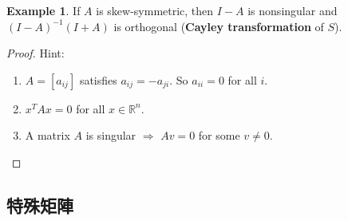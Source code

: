 \documentclass{article}
\theoremstyle{definition}
\newtheorem{example}{Example}[section]
\numberwithin{theorem}{section}
\numberwithin{equation}{section}
\begin{document}
\begin{example}
If $A$ is skew-symmetric, then $I - A$ is nonsingular and $(I - A)^{-1} (I + A)$ is orthogonal (\textbf{Cayley transformation} of $S$).
\end{example}

\begin{proof} Hint:
  \begin{enumerate}
  \item $A=[a_{ij}]$ satisfies $a_{ij}= - a_{ji}$. So $a_{ii}=0$ for  all $i$.
  \item $x^TAx=0$ for all $x\in \mathbb{R}^n$.
  \item A matrix $A$ is singular $\Rightarrow$ $Av=0$ for some $v\neq 0$.
  \end{enumerate}
\end{proof}


\subsection{特殊矩陣}
\end{document}
